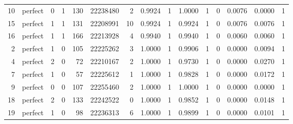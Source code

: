 \begin{sidewaystable}[]
\begin{tabular}{rlrrrrrrrrrrrrr}
10 & perfect & 0 & 1 & 130 & 22238480 & 2 & 0.9924 & 1 & 1.0000 & 1 & 0 & 0.0076 & 0.0000 & 1\\
15 & perfect & 1 & 1 & 131 & 22208991 & 10 & 0.9924 & 1 & 0.9924 & 1 & 0 & 0.0076 & 0.0076 & 1\\
16 & perfect & 1 & 1 & 166 & 22213928 & 4 & 0.9940 & 1 & 0.9940 & 1 & 0 & 0.0060 & 0.0060 & 1\\
2 & perfect & 1 & 0 & 105 & 22225262 & 3 & 1.0000 & 1 & 0.9906 & 1 & 0 & 0.0000 & 0.0094 & 1\\
4 & perfect & 2 & 0 & 72 & 22210167 & 2 & 1.0000 & 1 & 0.9730 & 1 & 0 & 0.0000 & 0.0270 & 1\\
7 & perfect & 1 & 0 & 57 & 22225612 & 1 & 1.0000 & 1 & 0.9828 & 1 & 0 & 0.0000 & 0.0172 & 1\\
9 & perfect & 0 & 0 & 107 & 22255460 & 2 & 1.0000 & 1 & 1.0000 & 1 & 0 & 0.0000 & 0.0000 & 1\\
18 & perfect & 2 & 0 & 133 & 22242522 & 0 & 1.0000 & 1 & 0.9852 & 1 & 0 & 0.0000 & 0.0148 & 1\\
19 & perfect & 1 & 0 & 98 & 22236313 & 6 & 1.0000 & 1 & 0.9899 & 1 & 0 & 0.0000 & 0.0101 & 1\\
\bottomrule
\end{tabular}
\end{sidewaystable}

